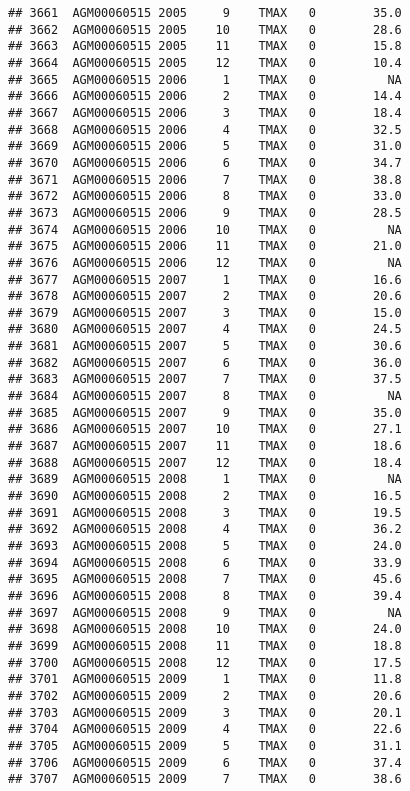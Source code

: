 \documentclass{article}\usepackage[]{graphicx}\usepackage[]{color}
\makeatletter
\newenvironment{kframe}{%
 \def\at@end@of@kframe{}%
 \ifinner\ifhmode%
  \def\at@end@of@kframe{\end{minipage}}%
  \begin{minipage}{\columnwidth}%
 \fi\fi%
 \def\FrameCommand##1{\hskip\@totalleftmargin \hskip-\fboxsep
 \colorbox{shadecolor}{##1}\hskip-\fboxsep
     \hskip-\linewidth \hskip-\@totalleftmargin \hskip\columnwidth}%
 \MakeFramed {\advance\hsize-\width
   \@totalleftmargin\z@ \linewidth\hsize
   \@setminipage}}%
 {\par\unskip\endMakeFramed%
 \at@end@of@kframe}
\newenvironment{knitrout}{}{} %
\makeatother
\begin{document}
\begin{knitrout}
\begin{kframe}
\begin{verbatim}
## 3661  AGM00060515 2005     9    TMAX   0        35.0
## 3662  AGM00060515 2005    10    TMAX   0        28.6
## 3663  AGM00060515 2005    11    TMAX   0        15.8
## 3664  AGM00060515 2005    12    TMAX   0        10.4
## 3665  AGM00060515 2006     1    TMAX   0          NA
## 3666  AGM00060515 2006     2    TMAX   0        14.4
## 3667  AGM00060515 2006     3    TMAX   0        18.4
## 3668  AGM00060515 2006     4    TMAX   0        32.5
## 3669  AGM00060515 2006     5    TMAX   0        31.0
## 3670  AGM00060515 2006     6    TMAX   0        34.7
## 3671  AGM00060515 2006     7    TMAX   0        38.8
## 3672  AGM00060515 2006     8    TMAX   0        33.0
## 3673  AGM00060515 2006     9    TMAX   0        28.5
## 3674  AGM00060515 2006    10    TMAX   0          NA
## 3675  AGM00060515 2006    11    TMAX   0        21.0
## 3676  AGM00060515 2006    12    TMAX   0          NA
## 3677  AGM00060515 2007     1    TMAX   0        16.6
## 3678  AGM00060515 2007     2    TMAX   0        20.6
## 3679  AGM00060515 2007     3    TMAX   0        15.0
## 3680  AGM00060515 2007     4    TMAX   0        24.5
## 3681  AGM00060515 2007     5    TMAX   0        30.6
## 3682  AGM00060515 2007     6    TMAX   0        36.0
## 3683  AGM00060515 2007     7    TMAX   0        37.5
## 3684  AGM00060515 2007     8    TMAX   0          NA
## 3685  AGM00060515 2007     9    TMAX   0        35.0
## 3686  AGM00060515 2007    10    TMAX   0        27.1
## 3687  AGM00060515 2007    11    TMAX   0        18.6
## 3688  AGM00060515 2007    12    TMAX   0        18.4
## 3689  AGM00060515 2008     1    TMAX   0          NA
## 3690  AGM00060515 2008     2    TMAX   0        16.5
## 3691  AGM00060515 2008     3    TMAX   0        19.5
## 3692  AGM00060515 2008     4    TMAX   0        36.2
## 3693  AGM00060515 2008     5    TMAX   0        24.0
## 3694  AGM00060515 2008     6    TMAX   0        33.9
## 3695  AGM00060515 2008     7    TMAX   0        45.6
## 3696  AGM00060515 2008     8    TMAX   0        39.4
## 3697  AGM00060515 2008     9    TMAX   0          NA
## 3698  AGM00060515 2008    10    TMAX   0        24.0
## 3699  AGM00060515 2008    11    TMAX   0        18.8
## 3700  AGM00060515 2008    12    TMAX   0        17.5
## 3701  AGM00060515 2009     1    TMAX   0        11.8
## 3702  AGM00060515 2009     2    TMAX   0        20.6
## 3703  AGM00060515 2009     3    TMAX   0        20.1
## 3704  AGM00060515 2009     4    TMAX   0        22.6
## 3705  AGM00060515 2009     5    TMAX   0        31.1
## 3706  AGM00060515 2009     6    TMAX   0        37.4
## 3707  AGM00060515 2009     7    TMAX   0        38.6

\end{verbatim}
\end{kframe}
\end{knitrout}
\end{document}
